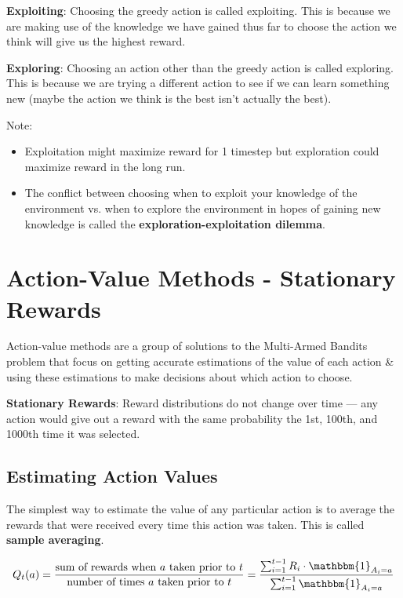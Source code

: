 \textbf{Exploiting}: Choosing the greedy action is called exploiting. This is because we are making use of the knowledge we have gained thus far to choose the action we think will give us the highest reward.

\textbf{Exploring}: Choosing an action other than the greedy action is called exploring. This is because we are trying a different action to see if we can learn something new (maybe the action we think is the best isn’t actually the best).

Note:
\begin{itemize}
    \item Exploitation might maximize reward for 1 timestep but exploration could maximize reward in the long run.
    \item The conflict between choosing when to exploit your knowledge of the environment vs. when to explore the environment in hopes of gaining new knowledge is called the \textbf{exploration-exploitation dilemma}.
\end{itemize}


\section{Action-Value Methods - Stationary Rewards \cite{medium-numsmt2-rl-ch2-part-2}}\label{Action-Value Methods - Stationary Rewards}
Action-value methods are a group of solutions to the Multi-Armed Bandits problem that focus on getting accurate estimations of the value of each action \& using these estimations to make decisions about which action to choose.

\textbf{Stationary Rewards}: Reward distributions do not change over time — any action would give out a reward with the same probability the 1st, 100th, and 1000th time it was selected.

\subsection{Estimating Action Values}
The simplest way to estimate the value of any particular action is to average the rewards that were received every time this action was taken. This is called \textbf{sample averaging}.

\[
    Q_t(a) = \displaystyle\frac{\text{sum of rewards when $a$ taken prior to $t$}}{\text{number of times $a$ taken prior to $t$}} = \displaystyle\frac{\sum_{i=1}^{t-1} R_i \cdot \mathbbm{1}_{A_i = a}}{\sum_{i=1}^{t-1} \mathbbm{1}_{A_i = a}}
\]

